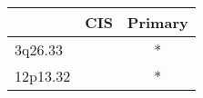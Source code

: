\begin{tabular}{lcc}
\toprule
{} & CIS & Primary \\
\midrule
3q26.33  &     &       * \\
12p13.32 &     &       * \\
\bottomrule
\end{tabular}
